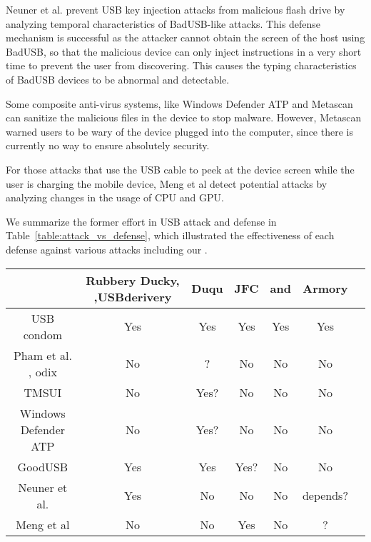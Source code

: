 Neuner et al.\cite{neuner2018usblock} prevent USB key injection attacks from malicious flash drive by analyzing temporal characteristics of BadUSB-like attacks. This defense mechanism is successful as the attacker cannot obtain the screen of the host using BadUSB, so that the malicious device can only inject instructions in a very short time to prevent the user from discovering. This causes the typing characteristics of BadUSB devices to be abnormal and detectable.

Some composite anti-virus systems, like Windows Defender ATP\cite{windenfender} and Metascan\cite{OPSWAT} can sanitize the malicious files in the device to stop malware. However, Metascan warned users to be wary of the device plugged into the computer, since there is currently no way to ensure absolutely security.


For those attacks that use the USB cable to peek at the device screen while the user is charging the mobile device, Meng et al\cite{meng2018252} detect potential attacks by analyzing changes in the usage of CPU and GPU.

We summarize the former effort in USB attack and defense in Table~\ref{table:attack_vs_defense}, which illustrated the effectiveness of each defense against various attacks including our \tool.
\begin{table*}
	\centering
	\begin{tabular}{|c|c|c|c|c|c|c|}
		
		
		\hline
		\diagbox {Defence}{Attack} & Rubbery Ducky\cite{rubber}, \cite{rubberducky2020},USBderivery\cite{usbdriver} & Duqu\cite{duqu} & JFC\cite{JFCImpact}&\cite{smartphone}\cite{poweremi} and \cite{usbdriver}& Armory\\
		
		\hline 
		USB condom \cite{Condom}& Yes & Yes & Yes & Yes & Yes\\
		\hline 
		Pham et al. \cite{pham2010optimizing}, odix\cite{OLEA}& No & ? & No & No & No\\
		\hline 
		TMSUI\cite{yang2015tmsui}& No & Yes? & No & No & No\\
		\hline 
		Windows Defender ATP\cite{windenfenderwhite}& No & Yes? & No & No & No\\
		\hline 
		GoodUSB\cite{tian2015defending}& Yes & Yes & Yes? & No & No \\

		\hline
		Neuner et al.\cite{neuner2018usblock}& Yes & No & No & No & depends? \\
		\hline
		Meng et al\cite{meng2018252}& No & No & Yes & No & ?\\
		\hline
	\end{tabular}
	\linebreak
	\caption{Effectiveness of defense against different attacks}
	\label{table:attack_vs_defense}
\end{table*}




